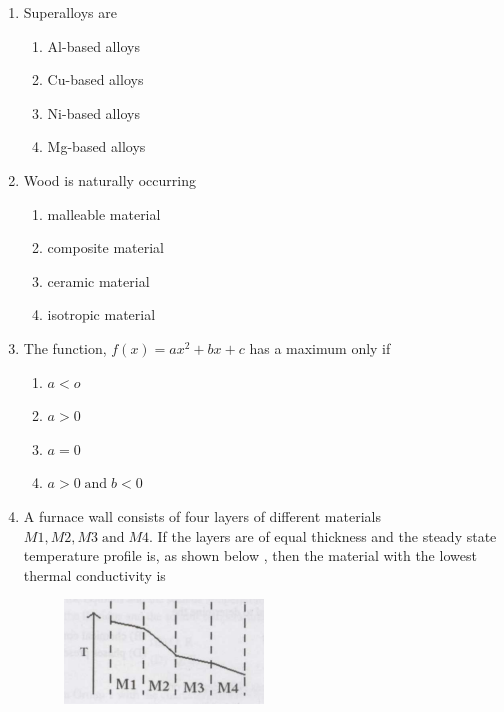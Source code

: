 \documentclass[journal]{IEEEtran}
\theoremstyle{remark}
\begin{document}
\begin{enumerate}
\item Superalloys are \hfill{}
\begin{multicols}{2}
\begin{enumerate}
\item Al-based alloys
\item Cu-based alloys
\item Ni-based alloys
\item Mg-based alloys
\end{enumerate}
\end{multicols}

\item Wood is naturally occurring 
\hfill{}
\begin{multicols}{2}
\begin{enumerate}
\item malleable material
\item composite material
\item ceramic material
\item isotropic material    
\end{enumerate}
\end{multicols}
\item The function, $f(x)=ax^2+bx+c$ has a maximum only if \hfill{}
\begin{multicols}{4}
\begin{enumerate}
        \item$a<o$
        \item $a>0$
        \item $a=0$
        \item $a>0\;\text{and}\;b<0$
\end{enumerate}
\end{multicols}
\item A furnace wall consists of four layers of different materials $M1,M2,M3 \;      \text{and}\; M4$. If the layers are of equal thickness and the steady state temperature profile is, as shown below , then the material with the lowest thermal conductivity is\hfill{}
\begin{figure}[H]
    \centering
    \includegraphics[width=0.5\textwidth]{figs/Q.12.png}

\end{figure}
\end{enumerate}
\end{document}
